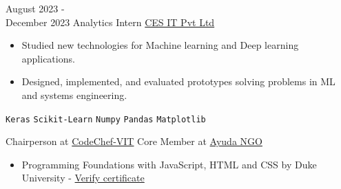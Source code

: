 \documentclass[9pt]{developercv}
\begin{document}
\vspace{-10 pt}
\begin{entrylist}
  \entry
  {August 2023 - \\
    December 2023}
  {Analytics Intern}
  {\href{https://www.cesltd.com/}{CES IT Pvt Ltd}}
  {\vspace{-10pt}
    \begin{itemize}[noitemsep,topsep=0pt,parsep=0pt,partopsep=0pt, leftmargin=-1pt]
      \item {Studied new technologies for Machine learning and Deep learning applications.}
      \item {Designed, implemented, and evaluated prototypes solving problems in ML and systems engineering.}
    \end{itemize}
    \texttt{Keras} \slashsep \texttt{Scikit-Learn} \slashsep \texttt{Numpy} \slashsep \texttt{Pandas} \slashsep \texttt{Matplotlib}}
\end{entrylist}
\vspace{-10 pt}
\vspace{-6pt}

\hspace{26mm} Chairperson at \href{https://codechefvit.com/}{CodeChef-VIT} \hspace{20mm}Core Member at \href{https://ngoayuda.org/}{Ayuda NGO}


\vspace{0 pt}
\vspace{-6pt}

\begin{itemize}[noitemsep,topsep=0pt,parsep=0pt,partopsep=0pt, leftmargin=75pt]
  \item Programming Foundations with JavaScript, HTML and CSS by Duke University - \href{https://coursera.org/verify/ZZVTGPTSR36H}{Verify certificate}
\end{itemize}

\end{document}
